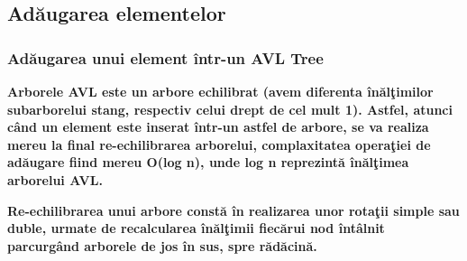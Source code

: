 \documentclass[12pt]{article}
\begin{document}
\subsection{Ad\u{a}ugarea elementelor}
\subsubsection{Ad\u{a}ugarea unui element \^{i}ntr-un AVL Tree}
\textbf{\hspace{7mm} Arborele AVL este un arbore echilibrat (avem diferenta \^{i}n\u{a}l\c{t}imilor subarborelui stang, respectiv celui drept de cel mult 1). Astfel, atunci c\^{a}nd un element este inserat \^{i}ntr-un astfel de arbore, se va realiza mereu la final re-echilibrarea arborelui, complaxitatea opera\c{t}iei de ad\u{a}ugare fiind mereu O(log n), unde log n reprezint\u{a} \^{i}n\u{a}l\c{t}imea arborelui AVL.}

\textbf{\hspace{2mm}Re-echilibrarea unui arbore const\u{a} \^{i}n realizarea unor rota\c{t}ii simple sau duble, urmate de recalcularea \^{i}n\u{a}l\c{t}imii fiec\u{a}rui nod \^{i}nt\^{a}lnit parcurg\^{a}nd arborele de jos \^{i}n sus, spre r\u{a}d\u{a}cin\u{a}.}
\end{document}
